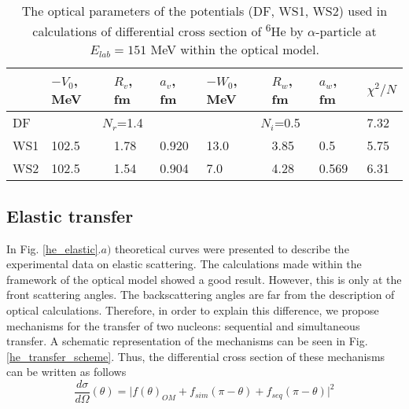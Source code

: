 \documentclass[
12pt, %
oneside, %
english, %
onehalfspacing, %
onehalfspacing, %
headsepline, %
]{MastersDoctoralThesis} %
\newcommand{\he}{\textsuperscript{6}He\xspace}
\begin{document}
\begin{table}[]
\footnotesize
\caption{The optical parameters of the potentials (DF, WS1, WS2) used in calculations of differential cross section of \he by $\alpha$-particle at $E_{lab}=151$ MeV within the optical model.}
\label{tab:he_elastic}
\begin{tabular*}{\textwidth}{@{\extracolsep{\fill}}llllllll}
\hline
    & $-V_0$, MeV & $R_v$, fm & $a_v$, fm & $-W_0$, MeV & $R_w$, fm & $a_w$, fm & $\chi^2/N$ \\ \hline
DF  & \multicolumn{3}{c}{$N_r$=1.4}        & \multicolumn{3}{c}{$N_i$=0.5}        & 7.32      \\
WS1 & 102.5       & 1.78      & 0.920     & 13.0        & 3.85      & 0.5       & 5.75      \\
WS2 & 102.5       & 1.54      & 0.904     & 7.0         & 4.28      & 0.569     & 6.31      \\ \hline
\end{tabular*}
\end{table}

\subsection{Elastic transfer}
In Fig. \ref{he_elastic}.$a)$ theoretical curves were presented to describe the experimental data on elastic scattering. The calculations made within the framework of the optical model showed a good result. However, this is only at the front scattering angles. The backscattering angles are far from the description of optical calculations. Therefore, in order to explain this difference, we propose mechanisms for the transfer of two nucleons: sequential and simultaneous transfer. A schematic representation of the mechanisms can be seen in Fig. \ref{he_transfer_scheme}.  Thus, the differential cross section of these mechanisms can be written as follows
\begin{equation}
\dfrac{d\sigma}{d\Omega}(\theta) =
 \vert f(\theta)_{OM} + f_{sim}(\pi - \theta)+ f_{seq}(\pi - \theta)  \vert^2
\end{equation}
\end{document}
